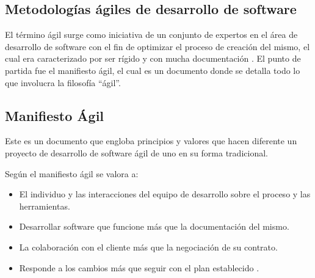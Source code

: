 \documentclass[../Main.tex]{subfiles}
\begin{document}
\subsection{Metodologías ágiles de desarrollo de software} 
\begin{justify}
El término ágil \cite{25} surge como iniciativa de un conjunto de expertos en el área de desarrollo de software con el fin de optimizar el proceso de creación del mismo, el cual era caracterizado por ser rígido y con mucha documentación \cite{26}. El punto de partida fue el manifiesto ágil, el cual es un documento donde se detalla todo lo que involucra la filosofía “ágil”.
\end{justify}\par

\subsection{Manifiesto Ágil}
\begin{justify}
Este es un documento que engloba principios y valores que hacen diferente un proyecto de desarrollo de software ágil de uno en su forma tradicional. 
\end{justify}\par

\begin{justify}
Según el manifiesto ágil se valora a: 
\end{justify}\par
\begin{itemize}
	\item El individuo y las interacciones del equipo de desarrollo sobre el proceso y las herramientas.\par

	\item Desarrollar software que funcione más que la documentación del mismo.  \par

	\item La colaboración con el cliente más que la negociación de su contrato.  \par

    \item Responde a los cambios más que seguir con el plan establecido \cite{26}.
\end{itemize}\par
\end{document}

